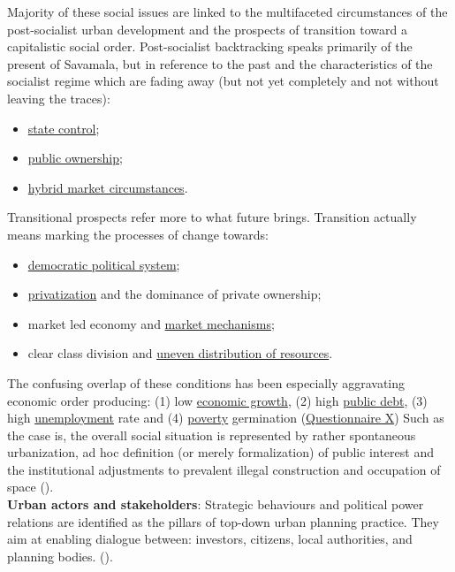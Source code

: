 \documentclass[11pt]{report}
\begin{document}
\begin{itemize}
Majority of these social issues are linked to the multifaceted circumstances of the post-socialist urban development and the prospects of transition toward a capitalistic social order.
Post-socialist backtracking speaks primarily of the present of Savamala, but in reference to the past and the characteristics of the socialist regime which are fading away (but not yet completely and not without leaving the traces):

\begin{itemize}
\item \underline{state control};
\item \underline{public ownership};
\item \underline{hybrid market circumstances}.
\end{itemize}

Transitional prospects refer more to what future brings. Transition actually means marking the processes of change towards:

\begin{itemize}
\item \underline{democratic political system};
\item \underline{privatization} and the dominance of private ownership;
\item market led economy and \underline{market mechanisms};
\item clear class division and \underline{uneven distribution of resources}.
\end{itemize}

The confusing overlap of these conditions has been especially aggravating economic order producing:
(1) low \underline{economic growth},
(2) high \underline{public debt},
(3) high \underline{unemployment} rate
and
(4) \underline{poverty} germination (\href{Questionnaire Experts Post-socialist}{Questionnaire X})
Such as the case is, the overall social situation is represented by rather spontaneous urbanization, ad hoc definition (or merely formalization) of public interest and the institutional adjustments to prevalent illegal construction and occupation of space (\href{ref}{\citealt{ministarstvo_prostora_urbani_2014}}).
\\

\textbf{Urban actors and stakeholders}:
Strategic behaviours and political power relations are identified as the pillars of top-down urban planning practice.
They aim at enabling dialogue between: investors, citizens, local authorities, and planning bodies.
(\cite{Vujosevic 2004 Belgrade Metropolitan Area Governance}).


\end{itemize}
\end{document}
